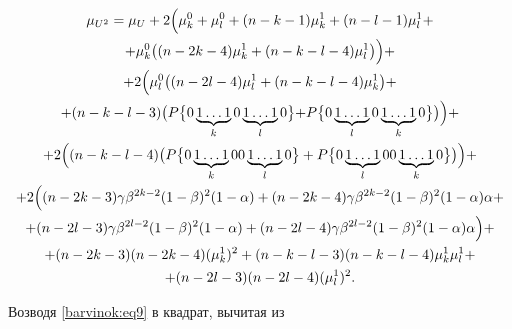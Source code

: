 \begin{multline} 

\label{barvinok:eq10}

 \mu _{U^2}  = \mu _U +2 \Bigl(\mu _k^0 +\mu _l^0 + (n-k-1)\mu

_k^1 + (n-l-1)\mu _l^1 + \\

+\mu _k^0 \bigl( (n-2k-4) \mu _k^1 + (n-k-l-4)\mu _l^1 \bigr) \Bigr)+ \\

+2 \Bigl( \mu _l^0 \bigl((n-2l-4)\mu _l^1 + (n-k-l-4)\mu _k^1\bigr)+ \\ +

(n-k-l-3) %


\bigl( P\bigl\{0\underbrace {1 \ldots 1}_k0\underbrace {1\ldots 1}_l0\bigl\}+

P\bigl\{ 0\underbrace {1\ldots 1}_l0\underbrace {1\ldots 1}_k0 \bigr\}\bigr) \Bigr)+\\

+2\Bigl( (n-k-l-4) \bigl(P\bigl\{ 0\underbrace {1\ldots 1}_k0

0\underbrace {1\ldots 1}_l0 \bigr\}+ 

P\bigl\{ 0\underbrace {1\ldots 1}_l00\underbrace

{1\ldots 1}_k0 \bigr\} \bigr)\Bigr)+ \\ +

2\Bigl( ( n-2k-3)\gamma \beta^{2k-2}(1-\beta)^2(1-\alpha )

 +(n-2k-4)\gamma \beta ^{2k-2}(1-\beta)^2(1-\alpha)\alpha + \\ 

 + (n-2l-3)\gamma \beta ^{2l-2}(1-\beta)^2 %


 (1-\alpha)+  (n-2l-4)\gamma \beta ^{2l-2} (1-\beta)^2

(1-\alpha)\alpha  \Bigr) +\\

+ (n-2k-3)(n-2k-4)(\mu _k^1 )^2 %

+(n-k-l-3)(n-k-l-4)\mu _k^1 \mu _l^1 + \\ +(n-2l-3)(n-2l-4)(\mu _l^1

)^2.

\end{multline}

Возводя \eqref{barvinok:eq9} в квадрат, вычитая из

